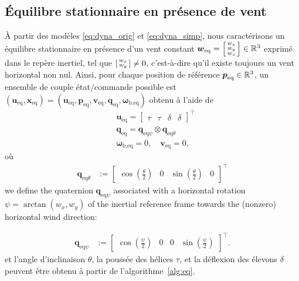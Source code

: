     \subsection{Équilibre stationnaire en présence de vent}
    À partir des modèles \eqref{eq:dyna_orig} et \eqref{eq:dyna_simp}, nous caractérisons un équilibre stationnaire en présence d'un vent constant $\boldsymbol{w}_{\mathrm{eq}} =\left[ \begin{smallmatrix}w_x \\ w_y \\w_z \end{smallmatrix} \right] \in {\mathbb R}^3$ exprimé dans le repère inertiel, tel que $\left[ \begin{smallmatrix}w_x \\ w_y \end{smallmatrix} \right] \neq 0$, c'est-à-dire qu'il existe toujours un vent horizontal non nul.
    Ainsi, pour chaque position de référence $\boldsymbol{p}_{\text{eq}} \in {\mathbb R}^3$, 
    un ensemble de couple état/commande possible est $(\boldsymbol{u}_{\text{eq}}, \boldsymbol{x}_{\text{eq}}) = (\boldsymbol{u}_{\text{eq}}, \boldsymbol{p}_{\text{eq}}, \boldsymbol{v}_{\text{eq}}, \boldsymbol{q}_{\text{eq}}, \boldsymbol{\omega}_{\text{b},\text{eq}})$
    obtenu à l'aide de
    \begin{subequations}
    \label{eq:equilibrium}
    \begin{align}
    \label{eq:ueq}
            &\boldsymbol{u}_{\text{eq}} = \begin{bmatrix} \tau & \tau & \delta & \delta \end{bmatrix}^\top\\
            & \boldsymbol{q}_{\text{eq}} = \boldsymbol{q}_{\mathrm{eq}\psi} \otimes  \boldsymbol{q}_{\mathrm{eq}\theta} \label{eq:qeq}\\
            &\boldsymbol{\omega}_{\text{b},\text{eq}} = 0 , \quad \boldsymbol{v}_{\text{eq}} = 0, 
    \end{align}
    \end{subequations}
    où
    \begin{align}
    \label{eq:qtheta}
        \boldsymbol{q}_{\mathrm{eq}\theta} &:= \begin{bmatrix} \cos(\frac{\theta}{2}) & 0 & \sin(\frac{\theta}{2}) & 0 \end{bmatrix}^\top
    \end{align}
    we define the quaternion $\boldsymbol{q}_{\mathrm{eq}\psi}$ associated with a horizontal rotation $\psi = \arctan(w_{x}, w_{y})$ of the inertial reference frame towards the (nonzero) horizontal wind direction:

    \begin{align}
    \label{eq:qpsi}
        \boldsymbol{q}_{\mathrm{eq}\psi} &:= \begin{bmatrix} \cos(\frac{\psi}{2}) & 0 & 0 & \sin(\frac{\psi}{2}) \end{bmatrix}^\top.
    \end{align}
    et l'angle d'inclinaison $\theta$, la poussée des hélices $\tau$, et la déflexion des élevons $\delta$ peuvent être obtenu à partir de l'algorithme~\ref{alg:eq}. 

